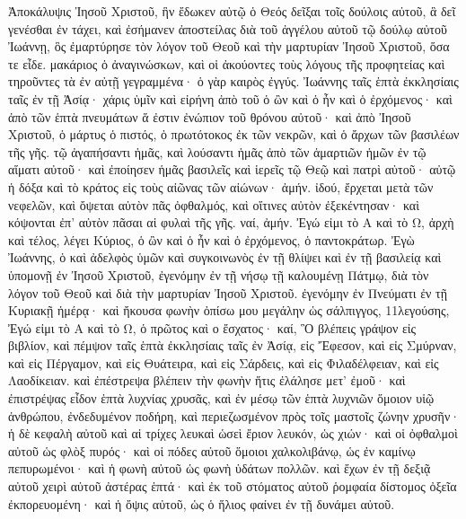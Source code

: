 \begin{pages}
    \begin{Leftside}
        \beginnumbering
		Ἀποκάλυψις Ἰησοῦ Χριστοῦ, ἣν ἔδωκεν αὐτῷ ὁ Θεός δεῖξαι τοῖς δούλοις αὐτοῦ, ἃ δεῖ γενέσθαι ἐν τάχει, καὶ ἐσήμανεν ἀποστείλας διὰ τοῦ ἀγγέλου αὐτοῦ τῷ δούλῳ αὐτοῦ Ἰωάννῃ, ὃς ἐμαρτύρησε τὸν λόγον τοῦ Θεοῦ καὶ τὴν μαρτυρίαν Ἰησοῦ Χριστοῦ, ὅσα τε εἶδε. μακάριος ὁ ἀναγινώσκων, καὶ οἱ ἀκούοντες τοὺς λόγους τῆς προφητείας καὶ τηροῦντες τὰ ἐν αὐτῇ γεγραμμένα· ὁ γὰρ καιρὸς ἐγγύς.
		\pend
		\pstart
			Ἰωάννης ταῖς ἑπτὰ ἐκκλησίαις ταῖς ἐν τῇ Ἀσίᾳ· χάρις ὑμῖν καὶ εἰρήνη ἀπὸ τοῦ ὁ ὢν καὶ ὁ ἦν καὶ ὁ ἐρχόμενος· καὶ ἀπὸ τῶν ἑπτὰ πνευμάτων ἅ ἐστιν ἐνώπιον τοῦ θρόνου αὐτοῦ· καὶ ἀπὸ Ἰησοῦ Χριστοῦ, ὁ μάρτυς ὁ πιστός, ὁ πρωτότοκος ἐκ τῶν νεκρῶν, καὶ ὁ ἄρχων τῶν βασιλέων τῆς γῆς. 
		\pend
		\pstart
			τῷ ἀγαπήσαντι ἡμᾶς, καὶ λούσαντι ἡμᾶς ἀπὸ τῶν ἁμαρτιῶν ἡμῶν ἐν τῷ αἵματι αὐτοῦ· καὶ ἐποίησεν ἡμᾶς βασιλεῖς καὶ ἱερεῖς τῷ Θεῷ καὶ πατρὶ αὐτοῦ· αὐτῷ ἡ δόξα καὶ τὸ κράτος εἰς τοὺς αἰῶνας τῶν αἰώνων· ἀμήν. 
		\pend
		\pstart	
			ἰδού, ἔρχεται μετὰ τῶν νεφελῶν, καὶ ὄψεται αὐτὸν πᾶς ὀφθαλμός, καὶ οἵτινες αὐτὸν ἐξεκέντησαν· καὶ κόψονται ἐπ’ αὐτὸν πᾶσαι αἱ φυλαὶ τῆς γῆς. ναί, ἀμήν.
		\pend
		\pstart
			Ἐγώ εἰμι τὸ Α καὶ τὸ Ω, ἀρχὴ καὶ τέλος, λέγει Κύριος, ὁ ὢν καὶ ὁ ἦν καὶ ὁ ἐρχόμενος, ὁ παντοκράτωρ.
		\pend
		\pstart
			Ἐγὼ Ἰωάννης, ὁ καὶ ἀδελφὸς ὑμῶν καὶ συγκοινωνὸς ἐν τῇ θλίψει καὶ ἐν τῇ βασιλείᾳ καὶ ὑπομονῇ ἐν Ἰησοῦ Χριστοῦ, ἐγενόμην ἐν τῇ νήσῳ τῇ καλουμένῃ Πάτμῳ, διὰ τὸν λόγον τοῦ Θεοῦ καὶ διὰ τὴν μαρτυρίαν Ἰησοῦ Χριστοῦ. ἐγενόμην ἐν Πνεύματι ἐν τῇ Κυριακῇ ἡμέρᾳ· καὶ ἤκουσα φωνὴν ὀπίσω μου μεγάλην ὡς σάλπιγγος, 11λεγούσης, Ἐγώ εἰμι τὸ Α καὶ τὸ Ω, ὁ πρῶτος καὶ ο ἔσχατος· καί, Ὃ βλέπεις γράψον εἰς βιβλίον, καὶ πέμψον ταῖς ἑπτὰ ἐκκλησίαις ταῖς ἐν Ἀσίᾳ, εἰς Ἔφεσον, καὶ εἰς Σμύρναν, καὶ εἰς Πέργαμον, καὶ εἰς Θυάτειρα, καὶ εἰς Σάρδεις, καὶ εἰς Φιλαδέλφειαν, καὶ εἰς Λαοδίκειαν. 
		\pend
		\pstart
			καὶ ἐπέστρεψα βλέπειν τὴν φωνὴν ἥτις ἐλάλησε μετ’ ἐμοῦ· καὶ ἐπιστρέψας εἶδον ἑπτὰ λυχνίας χρυσᾶς, καὶ ἐν μέσῳ τῶν ἑπτὰ λυχνιῶν ὅμοιον υἱῷ ἀνθρώπου, ἐνδεδυμένον ποδήρη, καὶ περιεζωσμένον πρὸς τοῖς μαστοῖς ζώνην χρυσῆν· ἡ δὲ κεφαλὴ αὐτοῦ καὶ αἱ τρίχες λευκαὶ ὡσεὶ ἔριον λευκόν, ὡς χιών· καὶ οἱ ὀφθαλμοὶ αὐτοῦ ὡς φλὸξ πυρός· καὶ οἱ πόδες αὐτοῦ ὅμοιοι χαλκολιβάνῳ, ὡς ἐν καμίνῳ πεπυρωμένοι· καὶ ἡ φωνὴ αὐτοῦ ὡς φωνὴ ὑδάτων πολλῶν. καὶ ἔχων ἐν τῇ δεξιᾷ αὐτοῦ χειρὶ αὐτοῦ ἀστέρας ἑπτά· καὶ ἐκ τοῦ στόματος αὐτοῦ ῥομφαία δίστομος ὀξεῖα ἐκπορευομένη· καὶ ἡ ὄψις αὐτοῦ, ὡς ὁ ἥλιος φαίνει ἐν τῇ δυνάμει αὐτοῦ. 

\end{Leftside}
\end{pages}
